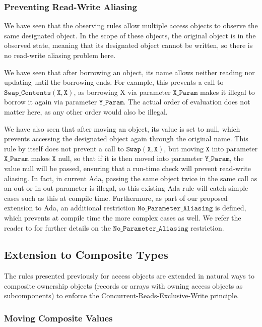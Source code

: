 \documentclass{llncs}
\newcommand\var[1]{\ensuremath{\mathtt{#1}}}
\newcommand{\keyword}[1]{\textsf{#1}}
\begin{document}
\subsubsection{Preventing Read-Write Aliasing}
\label{sec:noaliasing}

We have seen that the observing rules allow multiple access objects to observe the same designated object. In the scope of these objects, the original object is in the observed state, meaning that its designated object
cannot be written, so there is no read-write aliasing problem here.


We have seen that after borrowing an object, its name allows neither reading nor updating until the borrowing ends. For example, this prevents a call to \var{Swap\_Contents (X, X)},
as borrowing X via parameter \var{X\_Param} makes it illegal to borrow it again via parameter \var{Y\_Param}. The actual order of evaluation does not matter here, as any other order would also be illegal.


We have also seen that after moving an object, its value is set to null, which prevents accessing the designated object again through the original name.
This rule by itself does not prevent a call to \var{Swap(X, X)}, but moving \var{X} into parameter \var{X\_Param} makes \var{X} null, so that if it is then moved into parameter \var{Y\_Param}, the value null will be passed, ensuring
that a run-time check will prevent read-write aliasing.   In fact, in current Ada, passing the same object twice in the same call as an \keyword{out} or \keyword{in out} parameter is illegal, so this existing Ada rule will catch simple cases such as this at compile time.
Furthermore, as part of our proposed
extension to Ada, an additional restriction \var{No\_Parameter\_Aliasing} is defined,
which prevents at compile time the more complex cases as well. We refer the reader to \cite{AI2018} for further details on the \var{No\_Parameter\_Aliasing} restriction.


\subsection{Extension to Composite Types}
\label{subsec:ownershipComposite}

The rules presented previously for access objects are extended in natural ways to composite ownership objects (records or arrays with owning access objects as subcomponents) to enforce the Concurrent-Reads-Exclusive-Write principle.

\subsubsection{Moving Composite Values}
\label{subsubsec:movingComposite}
\end{document}
